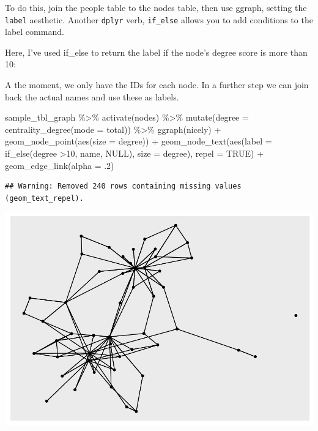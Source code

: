 \documentclass[
]{book}
\newenvironment{Shaded}{\begin{snugshade}}{\end{snugshade}}
\newcommand{\AttributeTok}[1]{\textcolor[rgb]{0.77,0.63,0.00}{#1}}
\newcommand{\ConstantTok}[1]{\textcolor[rgb]{0.00,0.00,0.00}{#1}}
\newcommand{\DecValTok}[1]{\textcolor[rgb]{0.00,0.00,0.81}{#1}}
\newcommand{\FunctionTok}[1]{\textcolor[rgb]{0.00,0.00,0.00}{#1}}
\newcommand{\NormalTok}[1]{#1}
\newcommand{\SpecialCharTok}[1]{\textcolor[rgb]{0.00,0.00,0.00}{#1}}
\newcommand{\StringTok}[1]{\textcolor[rgb]{0.31,0.60,0.02}{#1}}
\begin{document}
To do this, join the people table to the nodes table, then use ggraph, setting the \texttt{label} aesthetic. Another \texttt{dplyr} verb, \texttt{if\_else} allows you to add conditions to the label command.

Here, I've used if\_else to return the label if the node's degree score is more than 10:

A the moment, we only have the IDs for each node. In a further step we can join back the actual names and use these as labels.

\begin{Shaded}
\begin{Highlighting}[]
\NormalTok{sample\_tbl\_graph }\SpecialCharTok{\%\textgreater{}\%} 
  \FunctionTok{activate}\NormalTok{(nodes) }\SpecialCharTok{\%\textgreater{}\%} 
  \FunctionTok{mutate}\NormalTok{(}\AttributeTok{degree =} \FunctionTok{centrality\_degree}\NormalTok{(}\AttributeTok{mode =} \StringTok{\textquotesingle{}total\textquotesingle{}}\NormalTok{))  }\SpecialCharTok{\%\textgreater{}\%} 
  \FunctionTok{ggraph}\NormalTok{(}\StringTok{\textquotesingle{}nicely\textquotesingle{}}\NormalTok{) }\SpecialCharTok{+} 
  \FunctionTok{geom\_node\_point}\NormalTok{(}\FunctionTok{aes}\NormalTok{(}\AttributeTok{size =}\NormalTok{ degree)) }\SpecialCharTok{+} 
  \FunctionTok{geom\_node\_text}\NormalTok{(}\FunctionTok{aes}\NormalTok{(}\AttributeTok{label =} \FunctionTok{if\_else}\NormalTok{(degree }\SpecialCharTok{\textgreater{}}\DecValTok{10}\NormalTok{, name, }\ConstantTok{NULL}\NormalTok{), }\AttributeTok{size =}\NormalTok{ degree), }\AttributeTok{repel =} \ConstantTok{TRUE}\NormalTok{) }\SpecialCharTok{+} 
  \FunctionTok{geom\_edge\_link}\NormalTok{(}\AttributeTok{alpha =}\NormalTok{ .}\DecValTok{2}\NormalTok{)}
\end{Highlighting}
\end{Shaded}

\begin{verbatim}
## Warning: Removed 240 rows containing missing values (geom_text_repel).
\end{verbatim}

\includegraphics{_main_files/figure-latex/unnamed-chunk-64-1.pdf}
\end{document}
